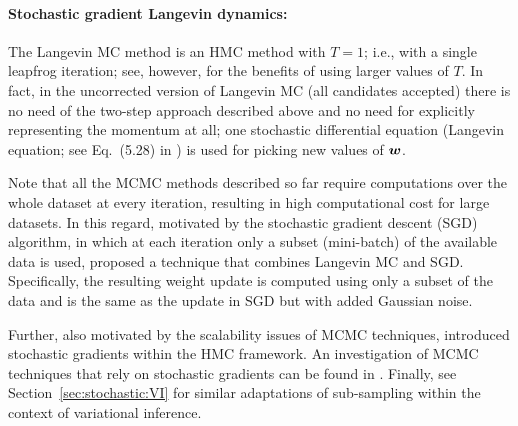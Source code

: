 \paragraph{Stochastic gradient Langevin dynamics:}\label{sec:sgld}
The Langevin MC method is an HMC method with $T=1$; i.e., with a single leapfrog iteration; see, however, \textcite{neal1993probabilistic} for the benefits of using larger values of $T$.  
In fact, in the uncorrected version of Langevin MC (all candidates accepted) there is no need of the two-step approach described above and no need for explicitly representing the momentum at all; one stochastic differential equation (Langevin equation; see Eq.~(5.28) in \cite{neal1993probabilistic}) is used for picking new values of $\boldsymbol{w}$. 

Note that all the MCMC methods described so far require computations over the whole dataset at every iteration, resulting in high computational cost for large datasets. 
In this regard, motivated by the stochastic gradient descent (SGD) algorithm, in which at each iteration only a subset (mini-batch) of the available data is used, \textcite{welling2011bayesian} proposed a technique that combines Langevin MC and SGD. 
Specifically, the resulting weight update is computed using only a subset of the data and is the same as the update in SGD but with added Gaussian noise. 

Further, also motivated by the scalability issues of MCMC techniques, \textcite{chen2014stochastic} introduced stochastic gradients within the HMC framework.
An investigation of MCMC techniques that rely on stochastic gradients can be found in \textcite{mandt2017stochastic}. 
Finally, see Section~\ref{sec:stochastic:VI} for similar adaptations of sub-sampling within the context of variational inference.

